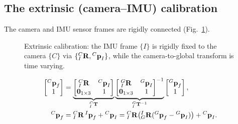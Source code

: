 \subsection{The extrinsic (camera--IMU) calibration}

The camera and IMU sensor frames are rigidly connected (Fig.~\ref{fig:lec03-extrinsic}).

\begin{figure}[H]
\centering
{}
\caption{Extrinsic calibration: the IMU frame $\{I\}$ is rigidly fixed to the camera $\{C\}$ via $\{{}^{C}_{I}\boldsymbol{\mathbf{R}},{}^{C}\boldsymbol{\mathbf{p}}_I\}$, while the camera-to-global transform is time varying.}
\label{fig:lec03-extrinsic}
\end{figure}

\begin{align}
\begin{bmatrix} {}^{C}\boldsymbol{\mathbf{p}}_f \\ 1 \end{bmatrix}
&= \underbrace{\begin{bmatrix} {}^{C}_{I}\boldsymbol{\mathbf{R}} & {}^{C}\boldsymbol{\mathbf{p}}_I \\ \boldsymbol{\mathbf{0}}_{1\times3} & 1 \end{bmatrix}}_{{}^{C}_{I}\boldsymbol{\mathbf{T}}}
\underbrace{\begin{bmatrix} {}^{G}_{I}\boldsymbol{\mathbf{R}} & {}^{G}\boldsymbol{\mathbf{p}}_I \\ \boldsymbol{\mathbf{0}}_{1\times3} & 1 \end{bmatrix}^{-1}}_{{}^{G}_{I}\boldsymbol{\mathbf{T}}^{-1}}
\begin{bmatrix} {}^{G}\boldsymbol{\mathbf{p}}_f \\ 1 \end{bmatrix}, \\
{}^{C}\boldsymbol{\mathbf{p}}_f &= {}^{C}_{I}\boldsymbol{\mathbf{R}}\,{}^{I}\boldsymbol{\mathbf{p}}_f + {}^{C}\boldsymbol{\mathbf{p}}_I = {}^{C}_{I}\boldsymbol{\mathbf{R}}\big({}^{I}_{G}\boldsymbol{\mathbf{R}}({}^{G}\boldsymbol{\mathbf{p}}_f - {}^{G}\boldsymbol{\mathbf{p}}_I)\big) + {}^{C}\boldsymbol{\mathbf{p}}_I.
\end{align}

